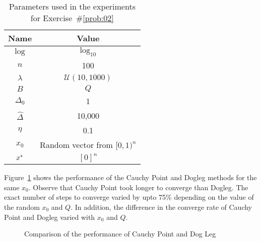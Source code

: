 \begin{table}[h]
  \caption{Parameters used in the experiments for Exercise~\#\ref{prob:02}}\label{tab:p02:experimentParameters}
  \centering
  \begin{tabular}{|c|c|}
    \hline
    \textbf{Name} & \textbf{Value} \\\hline
    \hline
    $\log$      &   $\log_{10}$\\\hline
    $n$         &   100\\\hline
    $\lambda$   &   $\mathcal{U}(10,1000)$ \\\hline
    $B$         &   $Q$ \\\hline
    $\Delta_0$  &   1 \\\hline
    $\hat{\Delta}$& 10,000 \\\hline 
    $\eta$      &   0.1\\\hline
    $x_0$       &   Random vector from $[0,1)^{n}$\\\hline
    $x^{*}$     &   $[0]^n$\\\hline
  \end{tabular}
\end{table}

Figure~\ref{fig:p02:ResultsComparison} shows the performance of the Cauchy Point and Dogleg methods for the same $x_0$.  Observe that Cauchy Point took longer to converge than Dogleg.  The exact number of steps to converge varied by upto 75\% depending on the value of the random $x_0$ and $Q$.  In addition, the difference in the converge rate of Cauchy Point and Dogleg varied with $x_0$ and $Q$.

\begin{figure}
  
  \caption{Comparison of the performance of Cauchy Point and Dog Leg}\label{fig:p02:ResultsComparison}
\end{figure}

